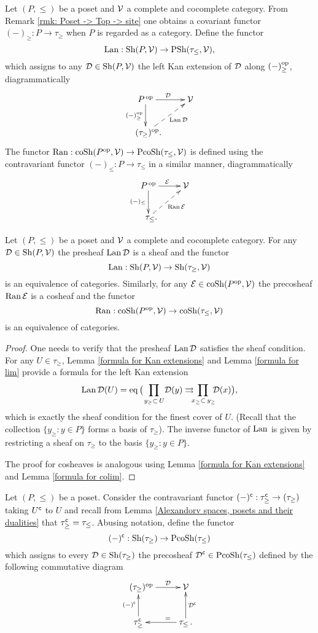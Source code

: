 \documentclass[thesis.tex]{subfiles}
\begin{document}
\begin{definition}
Let $(P,\leq)$ be a poset and $\operatorname{\mathcal{V}}$ a complete and cocomplete category. From Remark \ref{rmk: Poset -> Top -> site} one obtains a covariant functor $(-)_{\geq}:P\to\tau_\geq$ when $P$ is regarded as a category. Define the functor
$$\operatorname{Lan}:\operatorname{Sh}(P,\operatorname{\mathcal{V}})\to\operatorname{PSh}(\tau_{\leq},\operatorname{\mathcal{V}}),$$
which assigns to any $\operatorname{\mathcal{D}}\in\operatorname{Sh}(P,\operatorname{\mathcal{V}})$ the left Kan extension of $\operatorname{\mathcal{D}}$ along $(-)^{\mathrm{op}}_{\geq}$, diagrammatically
$$\xymatrix{P^{\,\op}\ar[r]^{\D}\ar[d]_{(-)^{\op}_\geq} & \V \\
\ \ (\tau_\geq)^{\op}. \ar@{-->}[ur]_-{\Lan\D} & }$$
The functor $\operatorname{Ran}:\operatorname{coSh}(P^{\mathrm{op}},\operatorname{\mathcal{V}})\to\operatorname{PcoSh}(\tau_{\leq},\operatorname{\mathcal{V}})$ is defined using the contravariant functor $(-)_{\leq}:P\to\tau_\leq$ in a similar manner, diagrammatically
$$\xymatrix{P^{\,\op}\ar[r]^{\E}\ar[d]_{(-)_\leq} & \V \\ \ \ \tau_\leq. \ar@{-->}[ur]_-{\Ran\E} & }$$
\end{definition}

\begin{lemma}
Let $(P,\leq)$ be a poset and $\operatorname{\mathcal{V}}$ a complete and cocomplete category. For any $\operatorname{\mathcal{D}}\in\operatorname{Sh}(P,\operatorname{\mathcal{V}})$ the presheaf $\operatorname{Lan}\operatorname{\mathcal{D}}$ is a sheaf and the functor $$\operatorname{Lan}:\operatorname{Sh}(P,\operatorname{\mathcal{V}})\to\operatorname{Sh}(\tau_{\geq},\operatorname{\mathcal{V}})$$ is an equivalence of categories.
Similarly, for any $\operatorname{\mathcal{E}}\in\operatorname{coSh}(P^{\mathrm{op}},\operatorname{\mathcal{V}})$ the precosheaf $\operatorname{Ran}\operatorname{\mathcal{E}}$ is a cosheaf and the functor $$\operatorname{Ran}:\operatorname{coSh}(P^{\mathrm{op}},\operatorname{\mathcal{V}})\to\operatorname{coSh}(\tau_{\leq},\operatorname{\mathcal{V}})$$ is an equivalence of categories.
\begin{proof}
One needs to verify that the presheaf $\operatorname{Lan}\operatorname{\mathcal{D}}$ satisfies the sheaf condition. For any $U\in\tau_\geq$, Lemma \ref{formula for Kan extensions} and Lemma \ref{formula for lim} provide a formula for the left Kan extension
$$\Lan\D(U)=\eq\big(\!\!\!\prod_{\,\,\,y_\geq \subset\, U\ }\!\!\!\D(y)\rightrightarrows\!\!\!\!\prod_{\,x_\geq\subset\, y_\geq}\!\!\!\D(x)\big),$$
which is exactly the sheaf condition for the finest cover of $U$. (Recall that the collection $\{y_\geq:y\in P\}$ forms a basis of $\tau_\geq$). The inverse functor of $\operatorname{Lan}$ is given by restricting a sheaf on $\tau_\geq$ to the basis $\{y_\geq:y\in P\}$.

The proof for cosheaves is analogous using Lemma \ref{formula for Kan extensions} and Lemma \ref{formula for colim}.
\end{proof}
\end{lemma}

\begin{definition}
Let $(P,\leq)$ be a poset. Consider the contravariant functor $(-)^{\mathsf{c}}:\tau^{\mathsf{c}}_\geq\to(\tau_\geq)$ taking $U^{\mathsf{c}}$ to $U$ and recall from Lemma \ref{Alexandorv spaces, posets and their dualities} that $\tau_\geq^{\mathsf{c}}=\tau_\leq$. Abusing notation, define the functor $$(-)^{\mathsf{c}}:\operatorname{Sh}(\tau_\geq)\to\operatorname{PcoSh}(\tau_\leq)$$
which assigns to every $\operatorname{\mathcal{D}}\in\operatorname{Sh}(\tau_\geq)$ the precosheaf $\operatorname{\mathcal{D}}^{\mathsf{c}}\in\operatorname{PcoSh}(\tau_\leq)$ defined by the following commutative diagram
$$\xymatrix{\ \ (\tau_\geq)^{\op} \ar[r]^-{\D} & \V \\ \tau_\geq^{\c}\ar[u]^{(-)^{\c}} & \tau_\leq \,. \ar[l]_{\ \ \ \ =} \ar[u]_{\D^{\c}} }$$
\end{definition}
\end{document}
